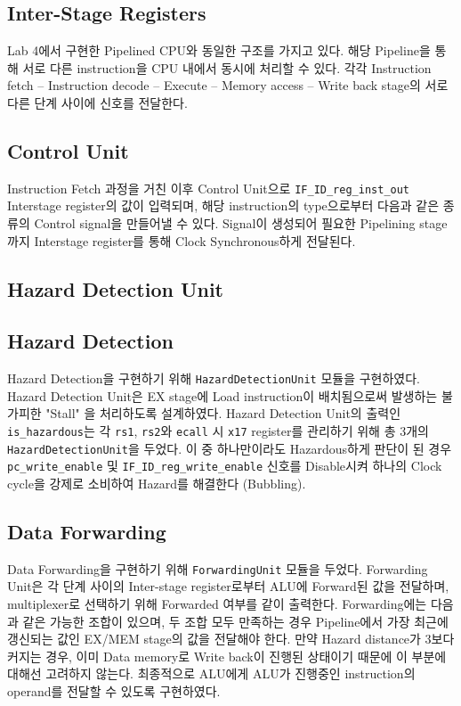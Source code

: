 \documentclass{scrartcl}
\begin{document}
\subsection{Inter-Stage Registers}
Lab 4에서 구현한 Pipelined CPU와 동일한 구조를 가지고 있다. 해당 Pipeline을 통해 서로 다른 instruction을 CPU 내에서 동시에 처리할 수 있다.
각각 Instruction fetch -- Instruction decode -- Execute -- Memory access -- Write back stage의 서로 다른 단계 사이에 신호를 전달한다.

\subsection{Control Unit}
Instruction Fetch 과정을 거친 이후 Control Unit으로 \texttt{IF\_ID\_reg\_inst\_out} Interstage register의 값이 입력되며, 해당 instruction의 type으로부터
다음과 같은 종류의 Control signal을 만들어낼 수 있다. Signal이 생성되어 필요한 Pipelining stage까지 Interstage register를 통해 Clock Synchronous하게 전달된다.

\subsection{Hazard Detection Unit}

\subsection{Hazard Detection}
Hazard Detection을 구현하기 위해 \texttt{HazardDetectionUnit} 모듈을 구현하였다. Hazard Detection Unit은 EX stage에 Load instruction이 배치됨으로써 발생하는 불가피한 "Stall" 을 처리하도록 설계하였다.
Hazard Detection Unit의 출력인 \texttt{is\_hazardous}는 각 \texttt{rs1}, \texttt{rs2}와 \texttt{ecall} 시 \texttt{x17} register를 관리하기 위해 총 3개의 \texttt{HazardDetectionUnit}을 두었다.
이 중 하나만이라도 Hazardous하게 판단이 된 경우 \texttt{pc\_write\_enable} 및 \texttt{IF\_ID\_reg\_write\_enable} 신호를 Disable시켜 하나의 Clock cycle을 강제로 소비하여 Hazard를 해결한다 (Bubbling).

\subsection{Data Forwarding}
Data Forwarding을 구현하기 위해 \texttt{ForwardingUnit} 모듈을 두었다. Forwarding Unit은 각 단계 사이의 Inter-stage register로부터 ALU에 Forward된 값을 전달하며, multiplexer로 선택하기 위해 Forwarded 여부를 같이 출력한다.
Forwarding에는 다음과 같은 가능한 조합이 있으며, 두 조합 모두 만족하는 경우 Pipeline에서 가장 최근에 갱신되는 값인 EX/MEM stage의 값을 전달해야 한다.
만약 Hazard distance가 3보다 커지는 경우, 이미 Data memory로 Write back이 진행된 상태이기 때문에 이 부분에 대해선 고려하지 않는다.
최종적으로 ALU에게 ALU가 진행중인 instruction의 operand를 전달할 수 있도록 구현하였다.
\end{document}
